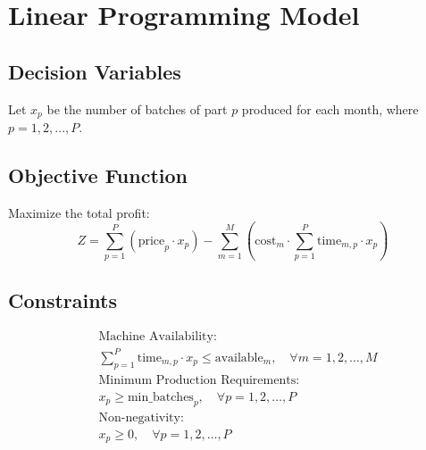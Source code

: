 \documentclass{article}
\begin{document}
\section*{Linear Programming Model}

\subsection*{Decision Variables}
Let \( x_p \) be the number of batches of part \( p \) produced for each month, where \( p = 1, 2, \ldots, P \).

\subsection*{Objective Function}
Maximize the total profit:
\[
Z = \sum_{p=1}^{P} \left( \text{price}_p \cdot x_p \right) - \sum_{m=1}^{M} \left( \text{cost}_m \cdot \sum_{p=1}^{P} \text{time}_{m,p} \cdot x_p \right)
\]

\subsection*{Constraints}
\begin{align*}
& \text{Machine Availability:} \\
& \sum_{p=1}^{P} \text{time}_{m,p} \cdot x_p \leq \text{available}_m, \quad \forall m = 1, 2, \ldots, M \\
& \text{Minimum Production Requirements:} \\
& x_p \geq \text{min\_batches}_p, \quad \forall p = 1, 2, \ldots, P \\
& \text{Non-negativity:} \\
& x_p \geq 0, \quad \forall p = 1, 2, \ldots, P
\end{align*}
\end{document}
